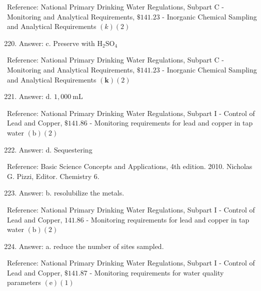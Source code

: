 \documentclass[10pt]{article}
\begin{document}
Reference: National Primary Drinking Water Regulations, Subpart C - Monitoring and Analytical Requirements, $\$ 141.23$ - Inorganic Chemical Sampling and Analytical Requirements $(k)(2)$

\begin{enumerate}
  \setcounter{enumi}{219}
  \item Answer: c. Preserve with $\mathrm{H}_{2} \mathrm{SO}_{4}$
\end{enumerate}

Reference: National Primary Drinking Water Regulations, Subpart C - Monitoring and Analytical Requirements, $\$ 141.23$ - Inorganic Chemical Sampling and Analytical Requirements $(\mathbf{k})(2)$

\begin{enumerate}
  \setcounter{enumi}{220}
  \item Answer: d. $1,000 \mathrm{~mL}$
\end{enumerate}

Reference: National Primary Drinking Water Regulations, Subpart I - Control of Lead and Copper, $\$ 141.86$ - Monitoring requirements for lead and copper in tap water $(\mathrm{b})(2)$

\begin{enumerate}
  \setcounter{enumi}{221}
  \item Answer: d. Sequestering
\end{enumerate}

Reference: Basic Science Concepts and Applications, 4th edition. 2010. Nicholas G. Pizzi, Editor. Chemistry 6.

\begin{enumerate}
  \setcounter{enumi}{222}
  \item Answer: b. resolubilize the metals.
\end{enumerate}

Reference: National Primary Drinking Water Regulations, Subpart I - Control of Lead and Copper, $141.86$ - Monitoring requirements for lead and copper in tap water $(\mathrm{b})(2)$

\begin{enumerate}
  \setcounter{enumi}{223}
  \item Answer: a. reduce the number of sites sampled.
\end{enumerate}

Reference: National Primary Drinking Water Regulations, Subpart I - Control of Lead and Copper, $\$ 141.87$ - Monitoring requirements for water quality parameters $(\mathrm{e})(1)$
\end{document}
